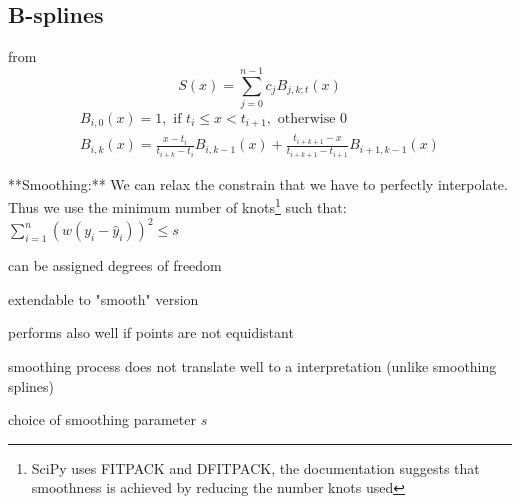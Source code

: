 



\subsection{B-splines}
\label{sec:B}
from \cite{lycheSplineMethods2005}
$$
  S(x)=\sum_{j=0}^{n-1} c_{j} B_{j, k ; t}(x)
$$
$$
  \begin{array}{r}
    B_{i, 0}(x)=1, \text { if } t_{i} \leq x<t_{i+1}, \text { otherwise } 0 \\
    B_{i, k}(x)=\frac{x-t_{i}}{t_{i+k}-t_{i}} B_{i, k-1}(x)+\frac{t_{i+k+1}-x}{t_{i+k+1}-t_{i+1}} B_{i+1, k-1}(x)
  \end{array}
$$

**Smoothing:**
We can relax the constrain that we have to perfectly interpolate. Thus we use the minimum number of knots\footnote{SciPy uses FITPACK and DFITPACK, the documentation suggests that smoothness is achieved by reducing the number knots used} such that:
$\sum_{i=1}^n(w (y_i - \hat y_i))^2 \leq s$
\begin{my_pros_cons_table}{
    \item can be assigned degrees of freedom
    \item extendable to "smooth" version
    \item performs also well if points are not equidistant
  }{
    \item smoothing process does not translate well to a interpretation (unlike smoothing splines)
    \item choice of smoothing parameter $s$
  }
\end{my_pros_cons_table}


